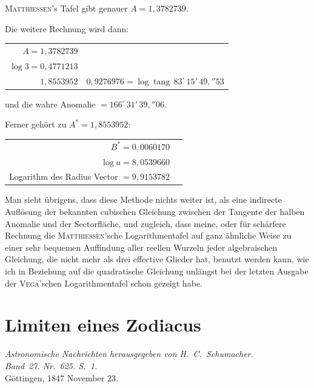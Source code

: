 \documentclass[11pt,a4paper]{book}
\newcommand{\tang}{\operatorname{tang}}
\begin{document}
\textsc{Matthiessen}'s Tafel gibt genauer $A = 1{,}3782739$.

Die weitere Rechnung wird dann:
\begin{center}
\begin{tabular}{r@{\quad}l}
$A = 1{,}3782739$ & \\
$\log 3 = 0{,}4771213$ & \\
\hline
$1{,}8553952$ & $0{,}9276976 = \log \tang\, 83^{\circ}\,15'\,49{,}''53$
\end{tabular}
\end{center}
und die wahre Anomalie $= 166^{\circ}\,31'\,39{,}''06$.

Ferner gehört zu $A^{*} = 1{,}8553952$:
\begin{center}
\begin{tabular}{r@{\quad}l}
$B^{*} = 0{,}0060170$ & \\
$\log a = 8{,}0539660$ & \\
\hline
Logarithm des Radius Vector $= 9{,}9153782$
\end{tabular}
\end{center}

Man sieht übrigens, dass diese Methode nichts weiter ist, als eine indirecte Auflösung der bekannten cubischen Gleichung zwischen der Tangente der halben Anomalie und der Sectorfläche, und zugleich, dass meine, oder für schärfere Rechnung die \textsc{Matthiessen}'sche Logarithmentafel auf ganz ähnliche Weise zu einer sehr bequemen Auffindung aller reellen Wurzeln jeder algebraischen Gleichung, die nicht mehr als drei effective Glieder hat, benutzt werden kann, wie ich in Beziehung auf die quadratische Gleichung unlängst bei der letzten Ausgabe der \textsc{Vega}'schen Logarithmentafel schon gezeigt habe.

\chapter*{Limiten eines Zodiacus}

\begin{center}
\textit{Astronomische Nachrichten herausgegeben von H.~C.~Schumacher.\\
Band~27. Nr.~625. S.~1.}\\[1em]
Göttingen, 1847 November 23.
\end{center}
\end{document}
